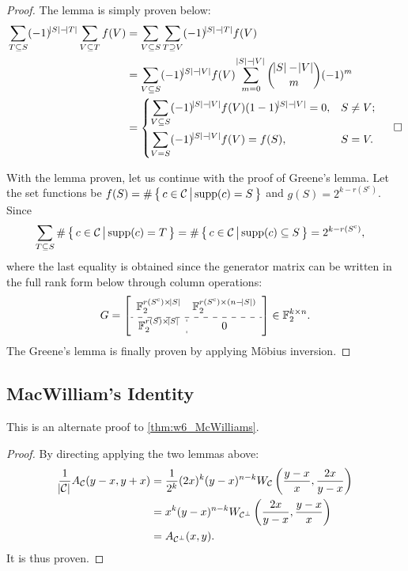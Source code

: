 \begin{proof}
        The lemma is simply proven below:
        \begin{align*}
            \sum_{T\subseteq S} (-1)^{\abs{S}-\abs{T}} \sum_{V\subseteq T} f(V) &= \sum_{V\subseteq S} \sum_{T\supseteq V} (-1)^{\abs{S}-\abs{T}} f(V) \\
            &= \sum_{V\subseteq S} (-1)^{\abs{S}-\abs{V}} f(V) \sum_{m=0}^{\abs{S}-\abs{V}} \binom{\abs{S}-\abs{V}}{m} (-1)^m \\
            &= \begin{dcases}
                \sum_{V\subseteq S} (-1)^{\abs{S}-\abs{V}} f(V) (1-1)^{\abs{S}-\abs{V}} = 0, &S\neq V;\\
                \sum_{V = S} (-1)^{\abs{S}-\abs{V}} f(V) = f(S), &S=V.
            \end{dcases}\;\;\;\;\;\square
        \end{align*}
        
    With the lemma proven, let us continue with the proof of Greene's lemma. Let the set functions be $f(S) = \#\left\{\,{c\in\mathcal{C}}\,\middle\vert\,{\mathrm{supp}(c)=S}\,\right\}$ and $g(S) = 2^{k-r(S^\mathrm{c})}$. Since
    \begin{align*}
        \sum_{T\subseteq S} \#\left\{\,{c\in\mathcal{C}}\,\middle\vert\,{\mathrm{supp}(c)=T}\,\right\} &= \#\left\{\,{c\in\mathcal{C}}\,\middle\vert\,{\mathrm{supp}(c)\subseteq S}\,\right\} = 2^{k-r(S^\mathrm{c})},
    \end{align*}
    where the last equality is obtained since the generator matrix can be written in the full rank form below through column operations:
    \begin{equation*}
        G = \left[\begin{array}{c:c}
            \mathbb{F}_2^{r(S^\mathrm{c})\times\abs{S}} & \mathbb{F}_2^{r(S^\mathrm{c})\times(n-\abs{S})} \vspace{0.1cm} \\ \hdashline 
            \mathbb{F}_2^{r(S)\times\abs{S}} & 0
        \end{array}\right] \in\mathbb{F}_2^{k\times n}.
    \end{equation*}
    The Greene's lemma is finally proven by applying M\"obius inversion.
\end{proof}

\subsection{MacWilliam's Identity}  \label{app:MacWilliams}
This is an alternate proof to \autoref{thm:w6_McWilliams}.
\begin{proof}
    By directing applying the two lemmas above:
    \begin{align*}
        \frac{1}{\abs{\mathcal{C}}}A_{\mathcal{C}}(y-x,y+x) &= \frac{1}{2^k} (2x)^k(y-x)^{n-k} W_\mathcal{C}\left(\frac{y-x}{x},\frac{2x}{y-x}\right) \\
        &= x^k (y-x)^{n-k} W_{\mathcal{C}^\perp}\left(\frac{2x}{y-x},\frac{y-x}{x}\right) \\
        &= A_{\mathcal{C}^\perp}(x,y).
    \end{align*}
    It is thus proven.
\end{proof}

